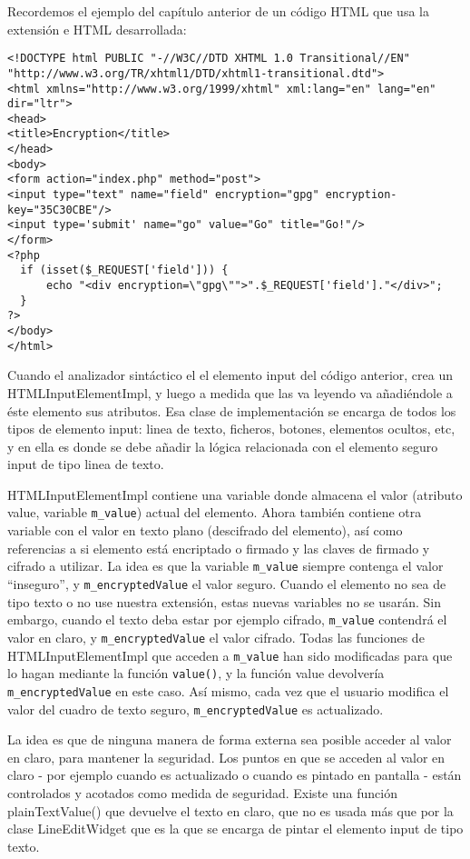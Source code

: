Recordemos el ejemplo del capítulo anterior de un código HTML que usa la extensión e HTML desarrollada:

\begin{verbatim}
<!DOCTYPE html PUBLIC "-//W3C//DTD XHTML 1.0 Transitional//EN" "http://www.w3.org/TR/xhtml1/DTD/xhtml1-transitional.dtd">
<html xmlns="http://www.w3.org/1999/xhtml" xml:lang="en" lang="en" dir="ltr">
<head>
<title>Encryption</title>
</head>
<body>
<form action="index.php" method="post">
<input type="text" name="field" encryption="gpg" encryption-key="35C30CBE"/>
<input type='submit' name="go" value="Go" title="Go!"/>
</form>
<?php
  if (isset($_REQUEST['field'])) {
      echo "<div encryption=\"gpg\"">".$_REQUEST['field']."</div>";
  }
?>
</body>
</html>
\end{verbatim}

Cuando el analizador sintáctico el el elemento input del código anterior, crea un HTMLInputElementImpl, y luego a medida que las va leyendo va añadiéndole a éste elemento sus atributos. Esa clase de implementación se encarga de todos los tipos de elemento input: linea de texto, ficheros, botones, elementos ocultos, etc, y en ella es donde se debe añadir la lógica relacionada con el elemento seguro input de tipo linea de texto. 

HTMLInputElementImpl contiene una variable donde almacena el valor (atributo value, variable \verb|m_value|) actual del elemento. Ahora también contiene otra variable con el valor en texto plano (descifrado del elemento), así como referencias a si elemento está encriptado o firmado y las claves de firmado y cifrado a utilizar. La idea es que la variable \verb|m_value| siempre contenga el valor ``inseguro'', y \verb|m_encryptedValue| el valor seguro. Cuando el elemento no sea de tipo texto o no use nuestra extensión, estas nuevas variables no se usarán.  Sin embargo, cuando el texto deba estar por ejemplo cifrado, \verb|m_value| contendrá el valor en claro, y \verb|m_encryptedValue| el valor cifrado. Todas las funciones de HTMLInputElementImpl que acceden a \verb|m_value| han sido modificadas para que lo hagan mediante la función \verb|value()|, y la función value devolvería \verb|m_encryptedValue| en este caso. Así mismo, cada vez que el usuario modifica el valor del cuadro de texto seguro, \verb|m_encryptedValue| es actualizado.

La  idea es que de ninguna manera de forma externa sea posible acceder al valor en claro, para mantener la seguridad. Los puntos en que se acceden al valor en claro - por ejemplo cuando es actualizado o cuando es pintado en pantalla - están controlados y acotados como medida de seguridad. Existe una función plainTextValue() que devuelve el texto en claro, que no es usada más que por la clase LineEditWidget que es la que se encarga de pintar el elemento input de tipo texto.

